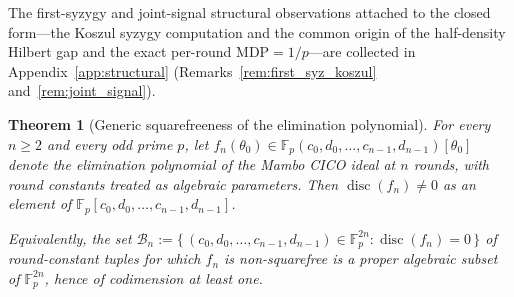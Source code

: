 \documentclass[11pt,a4paper]{article}
\newtheorem{theorem}{Theorem}[section]
\theoremstyle{definition}
\newcommand{\Fp}{\mathbb{F}_p}
\begin{document}
The first-syzygy and joint-signal structural observations attached to
the closed form---the Koszul syzygy computation and the common origin
of the half-density Hilbert gap and the exact per-round
$\mathrm{MDP} = 1/p$---are collected in
Appendix~\ref{app:structural}
(Remarks~\ref{rem:first_syz_koszul} and~\ref{rem:joint_signal}).

\begin{theorem}[Generic squarefreeness of the elimination polynomial]\label{thm:generic_sqfree}
For every $n \ge 2$ and every odd prime $p$, let
$f_n(\theta_0)\in\Fp(c_0,d_0,\dots,c_{n-1},d_{n-1})[\theta_0]$ denote the
elimination polynomial of the Mambo CICO ideal at $n$ rounds, with
round constants treated as algebraic parameters. Then
$\operatorname{disc}(f_n)\ne 0$ as an element of
$\Fp[c_0,d_0,\dots,c_{n-1},d_{n-1}]$.

Equivalently, the set
$\mathcal{B}_n := \{\,(c_0,d_0,\dots,c_{n-1},d_{n-1})\in\Fp^{2n}:
\operatorname{disc}(f_n) = 0\,\}$
of round-constant tuples for which $f_n$ is non-squarefree is a proper
algebraic subset of $\Fp^{2n}$, hence of codimension at least one.
\end{theorem}
\end{document}
